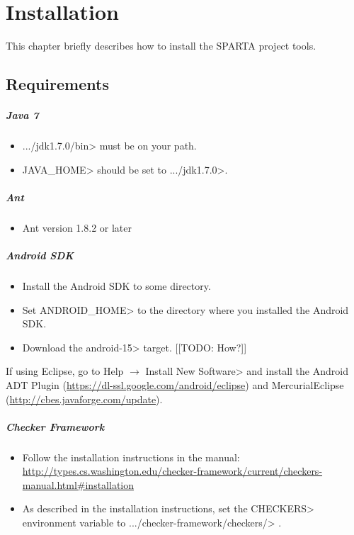 \htmlhr
\chapter{Installation\label{installation}}

This chapter briefly describes how to install the SPARTA project tools.

\section {Requirements\label{sec:requirements}}
\paragraph{Java 7}
\begin{itemize}
 \item  \<.../jdk1.7.0/bin> must be on your path.
 \item \<JAVA\_HOME> should be set to \<.../jdk1.7.0>.
\end{itemize}

\paragraph{Ant}
\begin{itemize}
 \item Ant version 1.8.2 or later
\end{itemize}

\paragraph{Android SDK}
\begin{itemize}
 \item Install the Android SDK to some directory. 
 \item Set \<ANDROID\_HOME> to the directory where you installed the
   Android SDK.
 \item Download the \<android-15> target.  [[TODO: How?]]
\end{itemize}

If using Eclipse, go to
\<Help $\rightarrow$ Install New Software>
and install the Android ADT Plugin (\url{https://dl-ssl.google.com/android/eclipse}) and MercurialEclipse (\url{http://cbes.javaforge.com/update}).

\paragraph{Checker Framework}
\begin{itemize}
\item Follow the installation instructions in the manual: 
\url{http://types.cs.washington.edu/checker-framework/current/checkers-manual.html#installation}
\item As described in the installation instructions, set the \<CHECKERS>
  environment variable to \<.../checker-framework/checkers/> .
\end{itemize}


